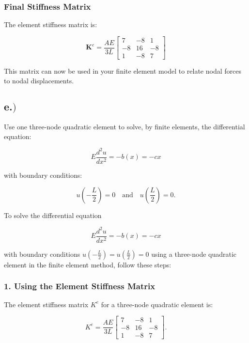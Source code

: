 \documentclass{article}
\begin{document}


\subsubsection*{Final Stiffness Matrix}

The element stiffness matrix is:

\begin{equation}
    \mathbf{K}^e = \frac{A E}{3 L} \begin{bmatrix} 7 & -8 & 1 \\ -8 & 16 & -8 \\ 1 & -8 & 7 \end{bmatrix}
\end{equation}

This matrix can now be used in your finite element model to relate nodal forces to nodal displacements.

\newpage
\subsection*{e.$)$}

Use one three-node quadratic element to solve, by finite elements, the differential equation:

\[
E \frac{d^2 u}{dx^2} = -b(x) = -cx
\]

with boundary conditions:

\[
u\left(-\frac{L}{2}\right) = 0 \quad \text{and} \quad u\left(\frac{L}{2}\right) = 0.
\]


To solve the differential equation

\[
E \frac{d^2 u}{dx^2} = -b(x) = -cx
\]

with boundary conditions \( u\left(-\frac{L}{2}\right) = u\left(\frac{L}{2}\right) = 0 \) using a three-node quadratic element in the finite element method, follow these steps:

\subsubsection*{1. Using the Element Stiffness Matrix}

The element stiffness matrix \( K^e \) for a three-node quadratic element is:

\[
K^e = \frac{AE}{3L} \begin{bmatrix} 7 & -8 & 1 \\ -8 & 16 & -8 \\ 1 & -8 & 7 \end{bmatrix}.
\]
\end{document}
